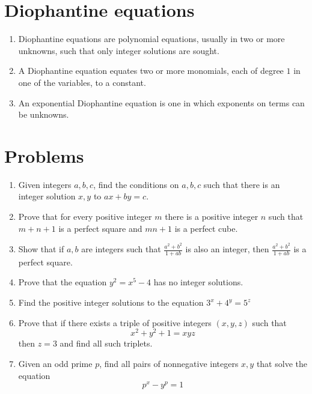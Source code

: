\documentclass{article}
\begin{document}
	
\section*{Diophantine equations}
\begin{enumerate}
	\item 
	Diophantine equations are polynomial equations, usually in two or more unknowns, such that only integer solutions are sought.
	\item 
	A Diophantine equation equates two or more monomials, each of degree $1$ in one of the variables, to a constant.
	\item 
	An exponential Diophantine equation is one in which exponents on terms can be unknowns. 
\end{enumerate}
\section*{Problems}
\begin{enumerate}
	\item 
	Given integers $a,b,c$, find the conditions on $a,b,c$ such that there is an integer solution $x,y$ to
	$ax+by=c$.
	\item %
	Prove that for every positive integer $m$ there is a positive integer $n$ such that $m+n+1$ is a perfect square and $mn+1$ is a perfect cube.
	
	\item %
	Show that if $a,b$ are integers such that $\tfrac{a^2+b^2}{1+ab}$ is also an integer, then $\tfrac{a^2+b^2}{1+ab}$ is a perfect square.
	
	\item %
	Prove that the equation $y^2=x^5-4$ has no integer solutions.
	\item %
	Find the positive integer solutions to the equation
	$3^x+4^y=5^z$	
	
	\item %
	Prove that if there exists a triple of positive integers $(x,y,z)$ such that 
	$$x^2 + y^2+1 = xyz$$
	then $z=3$ and find all such triplets.
	
	\item %
	Given an odd prime $p$, find all pairs of nonnegative integers $x,y$ that solve the equation
	$$p^x - y^p =1$$
	
\end{enumerate}
\end{document}
